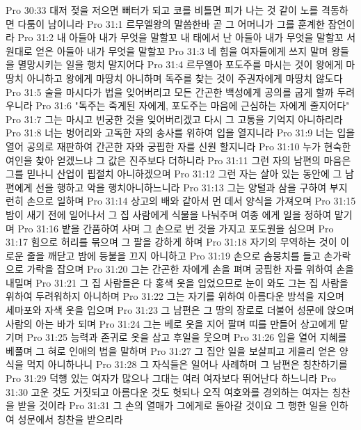 Pro 30:33  대저 젖을 저으면 뻐터가 되고 코를 비틀면 피가 나는 것 같이 노를 격동하면 다툼이 남이니라
Pro 31:1  르무엘왕의 말씀한바 곧 그 어머니가 그를 훈계한 잠언이라
Pro 31:2  내 아들아 내가 무엇을 말할꼬 내 태에서 난 아들아 내가 무엇을 말할꼬 서원대로 얻은 아들아 내가 무엇을 말할꼬
Pro 31:3  네 힘을 여자들에게 쓰지 말며 왕들을 멸망시키는 일을 행치 말지어다
Pro 31:4  르무엘아 포도주를 마시는 것이 왕에게 마땅치 아니하고 왕에게 마땅치 아니하며 독주를 찾는 것이 주권자에게 마땅치 않도다
Pro 31:5  술을 마시다가 법을 잊어버리고 모든 간곤한 백성에게 공의를 굽게 할까 두려우니라
Pro 31:6  "독주는 죽게된 자에게, 포도주는 마음에 근심하는 자에게 줄지어다"
Pro 31:7  그는 마시고 빈궁한 것을 잊어버리겠고 다시 그 고통을 기억지 아니하리라
Pro 31:8  너는 벙어리와 고독한 자의 송사를 위하여 입을 열지니라
Pro 31:9  너는 입을 열어 공의로 재판하여 간곤한 자와 궁핍한 자를 신원 할지니라
Pro 31:10  누가 현숙한 여인을 찾아 얻겠느냐 그 값은 진주보다 더하니라
Pro 31:11  그런 자의 남편의 마음은 그를 믿나니 산업이 핍절치 아니하겠으며
Pro 31:12  그런 자는 살아 있는 동안에 그 남편에게 선을 행하고 악을 행치아니하느니라
Pro 31:13  그는 양털과 삼을 구하여 부지런히 손으로 일하며
Pro 31:14  상고의 배와 같아서 먼 데서 양식을 가져오며
Pro 31:15  밤이 새기 전에 일어나서 그 집 사람에게 식물을 나눠주며 여종 에게 일을 정하여 맡기며
Pro 31:16  밭을 간품하여 사며 그 손으로 번 것을 가지고 포도원을 심으며
Pro 31:17  힘으로 허리를 묶으며 그 팔을 강하게 하며
Pro 31:18  자기의 무역하는 것이 이로운 줄을 깨닫고 밤에 등불을 끄지 아니하고
Pro 31:19  손으로 솜뭉치를 들고 손가락으로 가락을 잡으며
Pro 31:20  그는 간곤한 자에게 손을 펴며 궁핍한 자를 위하여 손을 내밀며
Pro 31:21  그 집 사람들은 다 홍색 옷을 입었으므로 눈이 와도 그는 집 사람을 위하여 두려워하지 아니하며
Pro 31:22  그는 자기를 위하여 아름다운 방석을 지으며 세마포와 자색 옷을 입으며
Pro 31:23  그 남편은 그 땅의 장로로 더불어 성문에 앉으며 사람의 아는 바가 되며
Pro 31:24  그는 베로 옷을 지어 팔며 띠를 만들어 상고에게 맡기며
Pro 31:25  능력과 존귀로 옷을 삼고 후일을 웃으며
Pro 31:26  입을 열어 지혜를 베풀며 그 혀로 인애의 법을 말하며
Pro 31:27  그 집안 일을 보살피고 게을리 얻은 양식을 먹지 아니하나니
Pro 31:28  그 자식들은 일어나 사례하며 그 남편은 칭찬하기를
Pro 31:29  덕행 있는 여자가 많으나 그대는 여러 여자보다 뛰어난다 하느니라
Pro 31:30  고운 것도 거짓되고 아름다운 것도 헛되나 오직 여호와를 경외하는 여자는 칭찬을 받을 것이라
Pro 31:31  그 손의 열매가 그에게로 돌아갈 것이요 그 행한 일을 인하여 성문에서 칭찬을 받으리라


